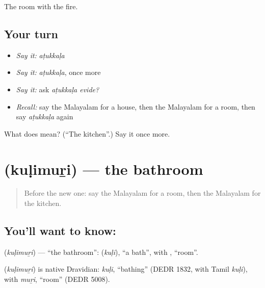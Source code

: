 \begin{grammarlens}[title={What you've built}]
The room with the fire.
\end{grammarlens}

\subsection*{Your turn}
\begin{itemize}
\raggedright
  \item \emph{Say it:} \emph{aṭukkaḷa}
  \item \emph{Say it:} \emph{aṭukkaḷa}, once more
  \item \emph{Say it:} ask \emph{aṭukkaḷa evide?}
  \item \emph{Recall:} say the Malayalam for a house, then the Malayalam for a room, then say \emph{aṭukkaḷa} again
\end{itemize}

\begin{tcolorbox}[breakable,colback=teal!4,colframe=teal!35!black,title={Before you move on}]
What does  mean? (\textquotedblleft{}The kitchen\textquotedblright{}.) Say it once more.
\end{tcolorbox}
\section[\texorpdfstring{\ml{കുളിമുറി} (kuḷimuṟi)}{കുളിമുറി (kuḷimuṟi)}]{ (kuḷimuṟi) — the bathroom}

\label{lesson:ML-C128-bathroom}



\begin{quote}
Before the new one: say the Malayalam for a room, then the Malayalam for the kitchen.
\end{quote}

\subsection*{You'll want to know: }
\textbf{} (\emph{kuḷimuṟi}) — \textquotedblleft{}the bathroom\textquotedblright{}: \textbf{} (\emph{kuḷi}), \textquotedblleft{}a bath\textquotedblright{}, with \textbf{}, \textquotedblleft{}room\textquotedblright{}.

\begin{cousinweb}
\textbf{} (\emph{kuḷimuṟi}) is native Dravidian: \emph{kuḷi}, \textquotedblleft{}bathing\textquotedblright{} (DEDR 1832, with Tamil \emph{kuḷi}), with \emph{muṟi}, \textquotedblleft{}room\textquotedblright{} (DEDR 5008).
\end{cousinweb}

